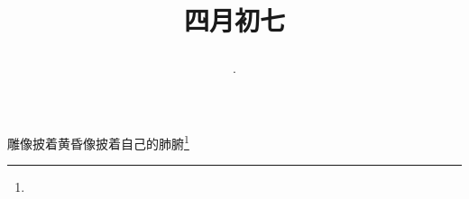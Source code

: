 \title{\date[d=14,m=5,y=2024][year:cn-y,年,month:cn,day:cn,日,·,weekday]·四月初七 }
雕像披着黄昏像披着自己的肺腑\footnote{ }

